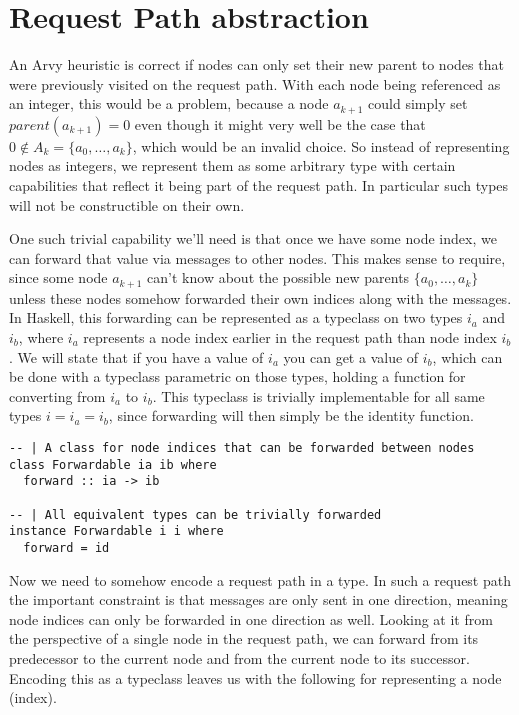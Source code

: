\documentclass[a4paper, oneside]{discothesis}
\begin{document}
\section{Request Path abstraction}

An Arvy heuristic is correct if nodes can only set their new parent to nodes that were previously visited on the request path. With each node being referenced as an integer, this would be a problem, because a node $a_{k+1}$ could simply set $parent(a_{k+1})=0$ even though it might very well be the case that $0\notin A_k=\{a_{0},\dots,a_{k}\}$, which would be an invalid choice. So instead of representing nodes as integers, we represent them as some arbitrary type with certain capabilities that reflect it being part of the request path. In particular such types will not be constructible on their own.

One such trivial capability we'll need is that once we have some node index, we can forward that value via messages to other nodes. This makes sense to require, since some node $a_{k+1}$ can't know about the possible new parents $\{a_{0},\dots,a_{k}\}$ unless these nodes somehow forwarded their own indices along with the messages. In Haskell, this forwarding can be represented as a typeclass on two types $i_a$ and $i_b$, where $i_a$ represents a node index earlier in the request path than node index $i_b$. We will state that if you have a value of $i_a$ you can get a value of $i_b$, which can be done with a typeclass parametric on those types, holding a function for converting from $i_a$ to $i_b$. This typeclass is trivially implementable for all same types $i=i_a=i_b$, since forwarding will then simply be the identity function.

\begin{verbatim}
-- | A class for node indices that can be forwarded between nodes
class Forwardable ia ib where
  forward :: ia -> ib

-- | All equivalent types can be trivially forwarded
instance Forwardable i i where
  forward = id
\end{verbatim}

Now we need to somehow encode a request path in a type. In such a request path the important constraint is that messages are only sent in one direction, meaning node indices can only be forwarded in one direction as well. Looking at it from the perspective of a single node in the request path, we can forward from its predecessor to the current node and from the current node to its successor. Encoding this as a typeclass leaves us with the following for representing a node (index).
\end{document}
